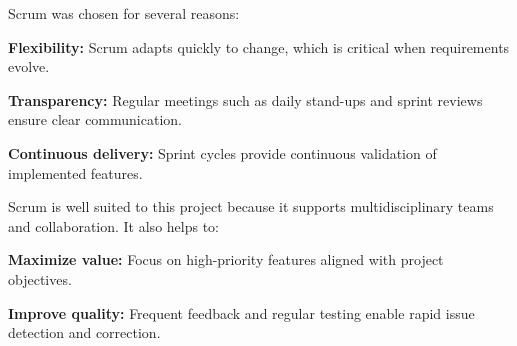 \vspace{6pt}

{\fontsize{12}{18}\selectfont
\setlength{\parindent}{1.2cm}
\setlength{\parskip}{6pt}

\indent Scrum was chosen for several reasons:

\begin{itemize}[leftmargin=2cm, itemsep=4pt]
  {\fontsize{12}{18}\selectfont
  \item \textbf{Flexibility:} Scrum adapts quickly to change, which is critical when requirements evolve.
  \item \textbf{Transparency:} Regular meetings such as daily stand-ups and sprint reviews ensure clear communication.
  \item \textbf{Continuous delivery:} Sprint cycles provide continuous validation of implemented features.
  }
\end{itemize}

}

\vspace{6pt}


\vspace{6pt}

{\fontsize{12}{18}\selectfont
\setlength{\parindent}{1.2cm}
\setlength{\parskip}{6pt}

\indent Scrum is well suited to this project because it supports multidisciplinary teams and collaboration. It also helps to:

\begin{itemize}[leftmargin=2cm, itemsep=4pt]
  {\fontsize{12}{18}\selectfont
  \item \textbf{Maximize value:} Focus on high-priority features aligned with project objectives.
  \item \textbf{Improve quality:} Frequent feedback and regular testing enable rapid issue detection and correction.
  }
\end{itemize}

}

\vspace{6pt}


\vspace{6pt}

